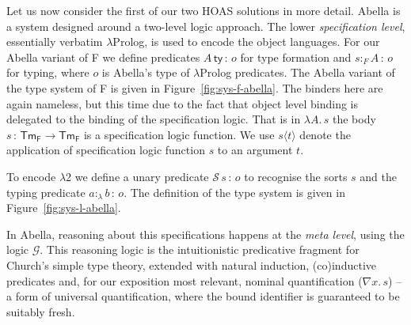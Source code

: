 \documentclass[a4paper,UKenglish]{lipics-v2016}
\newcommand{\ms}{\,}
\newcommand{\mrel}[1]{\mathrel{\ms #1 \ms}}
\newcommand{\OF}{\mrel{:}}
\newcommand{\SysL}{$\lambda$2\xspace}
\newcommand{\TmF}{\ensuremath{\mathsf{Tm_{F}}}}
\newcommand{\istyFh}[1]{\ensuremath{#1\ms\mathsf{ty}}}
\newcommand{\typingFh}[2]{\ensuremath{#1 \mathbin{:_{F}} #2}}
\newcommand{\sortLh}[1]{\ensuremath{\mathcal{S}\ms#1}}
\newcommand{\typingLh}[2]{\ensuremath{#1 \mathbin{:_{\lambda}} #2}}
\newcommand{\lpApp}[2]{#1\langle#2\rangle}
\newcommand{\Lam}[1]{\ensuremath{\lambda #1.\,}}
\begin{document}
Let us now consider the first of our two HOAS solutions in more detail.
Abella is a system designed around a two-level logic approach.
The lower \emph{specification level}, essentially verbatim $\lambda$Prolog, is used to encode the object languages.
For our Abella variant of F we define predicates $\istyFh{A} \OF o$ for type formation and $\typingFh{s}{A} \OF o$ for typing, where $o$ is Abella's type of $\lambda$Prolog predicates.
The Abella variant of the type system of F is given in Figure~\ref{fig:sys-f-abella}.
The binders here are again nameless, but this time due to the fact that object level binding is delegated to the binding of the specification logic.
That is in $\Lam{A}{s}$ the body $s \OF \TmF \to \TmF$ is a specification logic function.
We use $\lpApp{s}{t}$ denote the application of specification logic function $s$ to an argument $t$.

To encode \SysL we define a unary predicate $\sortLh{s} \OF o$ to recognise the sorts $s$ and the typing predicate $\typingLh{a}{b} \OF o$.
The definition of the type system is given in Figure~\ref{fig:sys-l-abella}.

In Abella, reasoning about this specifications happens at the \emph{meta level}, using the logic $\mathcal{G}$.
This reasoning logic is the intuitionistic predicative fragment for Church's simple type theory, extended with natural induction, (co)inductive predicates and, for our exposition most relevant, nominal quantification ($\nabla x . \ms s$) -- a form of universal quantification, where the bound identifier is guaranteed to be suitably fresh.
\end{document}
